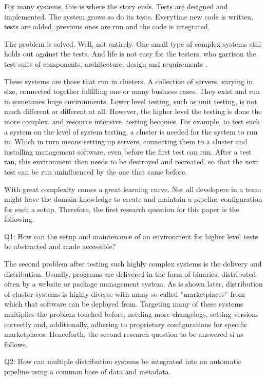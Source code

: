 For many systems, this is where the story ends.
Tests are designed and implemented.
The system grows so do its tests.
Everytime new code is written, tests are added, previous ones are run and the code is integrated.

The problem is solved.
Well, not entirely.
One small type of complex systems still holds out against the tests.
And life is not easy for the testers, who garrison the test suits of components, architecture, design and requirements \cite{AsterixBeginningSentence}.

These systems are those that run in clusters.
A collection of servers, varying in size, connected together fulfilling one or many business cases.
They exist and run in sometimes huge environments.
Lower level testing, such as unit testing, is not much different or different at all.
However, the higher level the testing is done the more complex, and resource intensive, testing becomes.
For example, to test such a system on the level of system testing, a cluster is needed for the system to run in.
Which in turn means setting up servers, connecting them to a cluster and installing management software, even before the first test can run.
After a test ran, this environment then needs to be destroyed and recreated, so that the next test can be run uninfluenced by the one that came before.

With great complexity comes a great learning curve.
Not all developers in a team might have the domain knowledge to create and maintain a pipeline configuration for such a setup.
Therefore, the first research question for this paper is the following.

Q1: How can the setup and maintenance of an environment for higher level tests be abstracted and made accessible?

The second problem after testing such highly complex systems is the delivery and distribution.
Usually, programs are delivered in the form of binaries, distributed often by a website or package management system.
As is shown later, distribution of cluster systems is highly diverse with many so-called ''marketplaces'' from which that software can be deployed from.
Targeting many of these systems multiplies the problem touched before, needing more changelogs, setting versions correctly and, additionally, adhering to proprietary configurations for specific marketplaces.
Henceforth, the second research question to be answered si as follows.

Q2: How can multiple distribution systems be integrated into an automatic pipeline using a common base of data and metadata.

